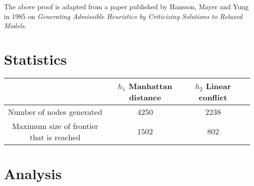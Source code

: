 \documentclass[11pt, a4paper]{article}
\begin{document}
The above proof is adapted from a paper published by Hansson, Mayer and Yung in 1985 on \textit{Generating Admissible Heuristics by Criticizing Solutions to Relaxed Models}.
\section{Statistics}
\begin{center}
  \begin{tabular}{ |c|c|c|c| }
    \hline
                                             & $h_1$ Manhattan distance & $h_2$ Linear conflict \\
    \hline
    Number of nodes generated                & 4250                     & 2238                  \\
    Maximum size of frontier that is reached & 1502                     & 802                   \\
    \hline
  \end{tabular}
\end{center}


\section{Analysis}
\end{document}
